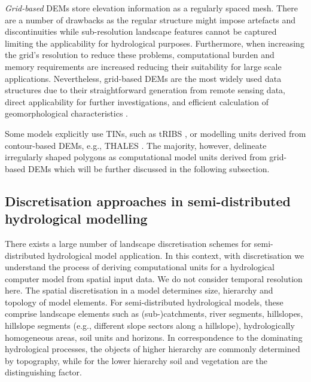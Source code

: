 \emph{Grid-based} DEMs store elevation information as a regularly spaced mesh.
There are a number of drawbacks as the regular structure might impose artefacts and discontinuities while sub-resolution landscape features cannot be captured limiting the applicability for hydrological purposes.
Furthermore, when increasing the grid's resolution to reduce these problems, computational burden and memory requirements are increased reducing their suitability for large scale applications.
Nevertheless, grid-based DEMs are the most widely used data structures due to their straightforward generation from remote sensing data, direct applicability for further investigations, and efficient calculation of geomorphological characteristics \citep{Moore1991a, DeVantier1993}.

Some models explicitly use TINs, such as tRIBS \citep{Ivanov2004}, or modelling units derived from contour-based DEMs, e.g., THALES \citep{Grayson1992}.
The majority, however, delineate irregularly shaped polygons as computational model units derived from grid-based DEMs which will be further discussed in the following subsection.

\subsection{Discretisation approaches in semi-distributed hydrological modelling}
\label{sec:review_approaches}
There exists a large number of landscape discretisation schemes for semi-distributed hydrological model application.
In this context, with discretisation we understand the process of deriving computational units for a hydrological computer model from spatial input data.
We do not consider temporal resolution here.
The spatial discretisation in a model determines size, hierarchy and topology of model elements.
For semi-distributed hydrological models, these comprise landscape elements such as (sub-)catchments, river segments, hillslopes, hillslope segments (e.g., different slope sectors along a hillslope), hydrologically homogeneous areas, soil units and horizons.
In correspondence to the dominating hydrological processes, the objects of higher hierarchy are commonly determined by topography, while for the lower hierarchy soil and vegetation are the distinguishing factor.

